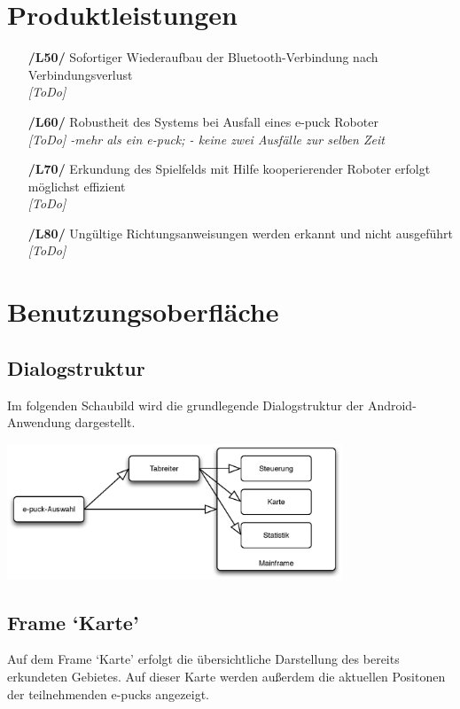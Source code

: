 \documentclass[10pt,a4paper]{article}
\begin{document}
	\section{Produktleistungen}
		\begin{itemize}
			\item[\textbf{/L50/}] Sofortiger Wiederaufbau der Bluetooth-Verbindung nach Verbindungsverlust
				\\ \textsl{[ToDo]}
			\item[\textbf{/L60/}] Robustheit des Systems bei Ausfall eines e-puck Roboter
				\\ \textsl{[ToDo] -mehr als ein e-puck; - keine zwei Ausfälle zur selben Zeit}
			\item[\textbf{/L70/}] Erkundung des Spielfelds mit Hilfe kooperierender Roboter erfolgt möglichst effizient
				\\ \textsl{[ToDo]}						
			\item[\textbf{/L80/}] Ungültige Richtungsanweisungen werden erkannt und nicht ausgeführt 
				\\ \textsl{[ToDo]}					
		\end{itemize}						
	\section{Benutzungsoberfläche}
	
			\subsection{Dialogstruktur}
			Im folgenden Schaubild wird die grundlegende Dialogstruktur der Android-Anwendung dargestellt.
			
			\includegraphics[width=10cm]{dialog.eps}
			
			\subsection{Frame `Karte'}
			Auf dem Frame `Karte' erfolgt die übersichtliche Darstellung des bereits erkundeten Gebietes. Auf dieser Karte werden außerdem
			die aktuellen Positonen der teilnehmenden e-pucks angezeigt.
			
\end{document}
